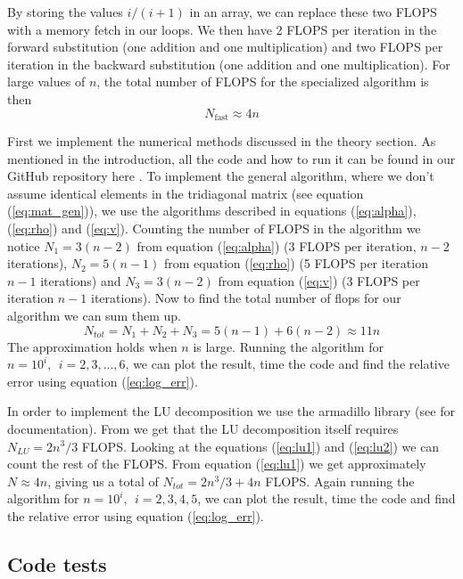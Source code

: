 \documentclass[reprint, english,notitlepage]{revtex4-1}  %
\begin{document}
By storing the values $i/(i+1)$ in an array, we can replace these two FLOPS with a memory fetch in our loops. We then have 2 FLOPS per iteration in the forward substitution (one addition and one multiplication) and two FLOPS per iteration in the backward substitution (one addition and one multiplication). For large values of $n$, the total number of FLOPS for the specialized algorithm is then
\begin{equation}
  \label{eq:flops_specialized}
  N_{\text{fast}} \approx 4n
\end{equation}

First we implement the numerical methods discussed in the theory section. As mentioned in the introduction, all the code and how to run it can be found in our GitHub repository here \citep{github}. To implement the general algorithm, where we don't assume identical elements in the tridiagonal matrix (see equation (\ref{eq:mat_gen})), we use the algorithms described in equations (\ref{eq:alpha}), (\ref{eq:rho}) and (\ref{eq:v}). Counting the number of FLOPS in the algorithm we notice $N_1 = 3(n-2)$ from equation (\ref{eq:alpha}) (3 FLOPS per iteration, $n-2$ iterations), $N_2 = 5(n-1)$ from equation (\ref{eq:rho}) (5 FLOPS per iteration $n-1$ iterations) and $N_3 = 3(n-2)$ from equation (\ref{eq:v}) (3 FLOPS per iteration $n-1$ iterations). Now to find the total number of flops for our algorithm we can sum them up.
\begin{equation*}
	N_{tot} = N_1+N_2+N_3 = 5(n-1) + 6(n-2) \approx 11n
\end{equation*}
The approximation holds when $n$ is large. Running the algorithm for $n=10^i,\ \ i = 2, 3, ..., 6$, we can plot the result, time the code and find the relative error using equation (\ref{eq:log_err}).

In order to implement the LU decomposition we use the armadillo library (see \citep{armadillo} for documentation). From \citep{lu_wiki} we get that the LU decomposition itself requires $N_{LU} = 2n^3/3$ FLOPS. Looking at the equations (\ref{eq:lu1}) and (\ref{eq:lu2}) we can count the rest of the FLOPS. From equation (\ref{eq:lu1}) we get approximately $N \approx 4n$, giving us a total of $N_{tot} = 2n^3/3 + 4n$ FLOPS. Again running the algorithm for $n=10^i,\ \ i = 2, 3, 4, 5$, we can plot the result, time the code and find the relative error using equation (\ref{eq:log_err}).


\subsection{Code tests}
\end{document}
